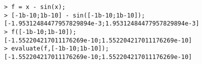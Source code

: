 \begin{center}\begin{minipage}{15cm}\begin{Verbatim}[frame=single]
> f = x - sin(x);
> [-1b-10;1b-10] - sin([-1b-10;1b-10]);
[-1.95312484477957829894e-3;1.95312484477957829894e-3]
> f([-1b-10;1b-10]);
[-1.552204217011176269e-10;1.552204217011176269e-10]
> evaluate(f,[-1b-10;1b-10]);
[-1.552204217011176269e-10;1.552204217011176269e-10]
\end{Verbatim}
\end{minipage}\end{center}
